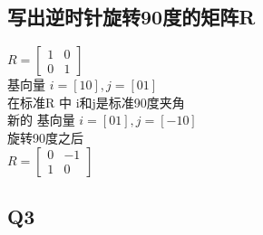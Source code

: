 \documentclass[12pt]{article}
\begin{document}
\subsection*{写出逆时针旋转90度的矩阵R}
\begin{flushleft}
$R = \begin{bmatrix}
    1 & 0\\ 
    0 & 1
\end{bmatrix}$ \\ 
基向量 $i = [1 0], j = [0 1]$ \\
在标准R 中 i和j是标准90度夹角 \\ 
新的 基向量 $i = [0 1], j = [-1 0]$ \\
旋转90度之后 \\ 
$R = \begin{bmatrix}
    0 & -1 \\
    1 & 0 
\end{bmatrix}$
\end{flushleft}

\subsection*{Q3}
\end{document}
